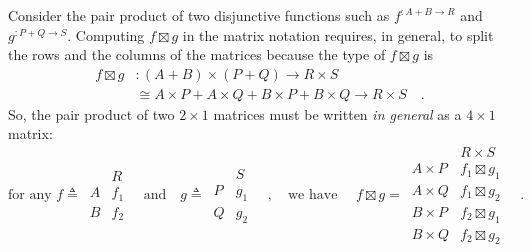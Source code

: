 Consider the pair product of two disjunctive functions such as $f^{:A+B\rightarrow R}$
and $g^{:P+Q\rightarrow S}$. Computing $f\boxtimes g$ in the matrix
notation requires, in general, to split the rows and the columns of
the matrices because the type of $f\boxtimes g$ is 
\begin{align*}
f\boxtimes g & :(A+B)\times(P+Q)\rightarrow R\times S\\
 & \cong A\times P+A\times Q+B\times P+B\times Q\rightarrow R\times S\quad.
\end{align*}
So, the pair product of two $2\times1$ matrices must be written \emph{in
general} as a $4\times1$ matrix:
\[
\text{for any }f\triangleq\,\begin{array}{|c||c|}
 & R\\
\hline A & f_{1}\\
B & f_{2}
\end{array}\quad\text{and}\quad g\triangleq\,\begin{array}{|c||c|}
 & S\\
\hline P & g_{1}\\
Q & g_{2}
\end{array}\quad,\quad\text{we have }\quad f\boxtimes g=\,\begin{array}{|c||c|}
 & R\times S\\
\hline A\times P & f_{1}\boxtimes g_{1}\\
A\times Q & f_{1}\boxtimes g_{2}\\
B\times P & f_{2}\boxtimes g_{1}\\
B\times Q & f_{2}\boxtimes g_{2}
\end{array}\quad.
\]

